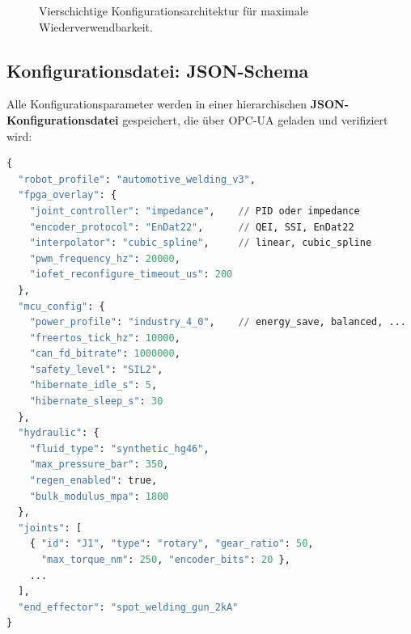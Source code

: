 ﻿\documentclass[a4paper,12pt]{scrreprt}
\theoremstyle{definition}
\begin{document}
\begin{figure}[H]
\centering
{}
\caption{Vierschichtige Konfigurationsarchitektur für maximale
  Wiederverwendbarkeit.}
\label{fig:konfig}
\end{figure}

\subsection{Konfigurationsdatei: JSON-Schema}

Alle Konfigurationsparameter werden in einer hierarchischen
\textbf{JSON-Konfigurationsdatei} gespeichert, die über OPC-UA
geladen und verifiziert wird:

\begin{lstlisting}[caption={IoFET-Roboter Konfigurationsdatei (Ausschnitt)},
  language=Python, morekeywords={true,false,null}]
{
  "robot_profile": "automotive_welding_v3",
  "fpga_overlay": {
    "joint_controller": "impedance",    // PID oder impedance
    "encoder_protocol": "EnDat22",      // QEI, SSI, EnDat22
    "interpolator": "cubic_spline",     // linear, cubic_spline
    "pwm_frequency_hz": 20000,
    "iofet_reconfigure_timeout_us": 200
  },
  "mcu_config": {
    "power_profile": "industry_4_0",    // energy_save, balanced, ...
    "freertos_tick_hz": 10000,
    "can_fd_bitrate": 1000000,
    "safety_level": "SIL2",
    "hibernate_idle_s": 5,
    "hibernate_sleep_s": 30
  },
  "hydraulic": {
    "fluid_type": "synthetic_hg46",
    "max_pressure_bar": 350,
    "regen_enabled": true,
    "bulk_modulus_mpa": 1800
  },
  "joints": [
    { "id": "J1", "type": "rotary", "gear_ratio": 50,
      "max_torque_nm": 250, "encoder_bits": 20 },
    ...
  ],
  "end_effector": "spot_welding_gun_2kA"
}
\end{lstlisting}
\end{document}
